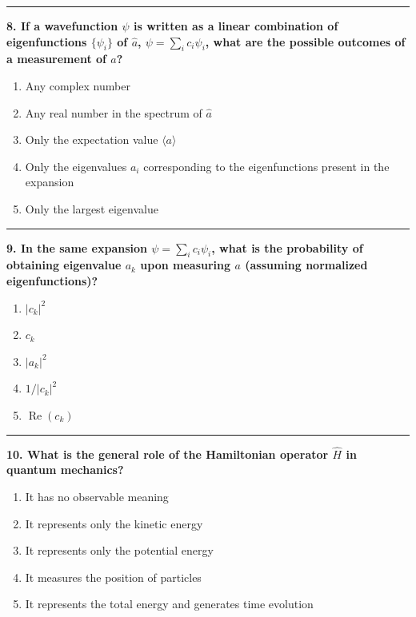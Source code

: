 \documentclass[
  english,
  9pt,
]{extbook}
\providecommand{\tightlist}{%
  \setlength{\itemsep}{0pt}\setlength{\parskip}{0pt}}
\theoremstyle{definition}
\theoremstyle{definition}
\theoremstyle{definition}
\theoremstyle{definition}
\theoremstyle{remark}
\begin{document}
\begin{center}\rule{0.5\linewidth}{0.5pt}\end{center}

\textbf{8. If a wavefunction \(\psi\) is written as a linear combination of eigenfunctions \(\{\psi_i\}\) of \(\hat{a}\), \(\psi = \sum_i c_i \psi_i\), what are the possible outcomes of a measurement of \(a\)?}

\begin{enumerate}
\def\labelenumi{\alph{enumi}.}
\tightlist
\item
  Any complex number
\item
  Any real number in the spectrum of \(\hat{a}\)\\
\item
  Only the expectation value \(\langle a \rangle\)\\
\item
  Only the eigenvalues \(a_i\) corresponding to the eigenfunctions present in the expansion\\
\item
  Only the largest eigenvalue
\end{enumerate}

\begin{center}\rule{0.5\linewidth}{0.5pt}\end{center}

\textbf{9. In the same expansion \(\psi = \sum_i c_i \psi_i\), what is the probability of obtaining eigenvalue \(a_k\) upon measuring \(a\) (assuming normalized eigenfunctions)?}

\begin{enumerate}
\def\labelenumi{\alph{enumi}.}
\tightlist
\item
  \(|c_k|^2\)
\item
  \(c_k\)\\
\item
  \(|a_k|^2\)\\
\item
  \(1/|c_k|^2\)\\
\item
  \(\operatorname{Re}(c_k)\)
\end{enumerate}

\begin{center}\rule{0.5\linewidth}{0.5pt}\end{center}

\textbf{10. What is the general role of the Hamiltonian operator \(\hat{H}\) in quantum mechanics?}

\begin{enumerate}
\def\labelenumi{\alph{enumi}.}
\tightlist
\item
  It has no observable meaning\\
\item
  It represents only the kinetic energy\\
\item
  It represents only the potential energy\\
\item
  It measures the position of particles\\
\item
  It represents the total energy and generates time evolution
\end{enumerate}
\end{document}
